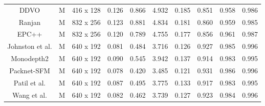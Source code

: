 \documentclass[journal]{IEEEtran}
\begin{document}
\begin{table*}
\begin{tabular}{cccccccccc}
DDVO \cite{wang2018learning}              & M                         & 416 x 128            & \multicolumn{1}{c}{0.126}   & \multicolumn{1}{c}{0.866}  & \multicolumn{1}{c}{4.932} & 0.185    & \multicolumn{1}{c}{0.851}           & \multicolumn{1}{c}{0.958}             & 0.986             \\
Ranjan \cite{ranjan2019competitive}            & M                         & 832 x 256            & \multicolumn{1}{c}{0.123}   & \multicolumn{1}{c}{0.881}  & \multicolumn{1}{c}{4.834} & 0.181    & \multicolumn{1}{c}{0.860}           & \multicolumn{1}{c}{0.959}             & 0.985             \\
EPC++ \cite{luo2019every}             & M                         & 832 x 256            & \multicolumn{1}{c}{0.120}   & \multicolumn{1}{c}{0.789}  & \multicolumn{1}{c}{4.755} & 0.177    & \multicolumn{1}{c}{0.856}           & \multicolumn{1}{c}{0.961}             & 0.987             \\
Johnston et al. \cite{johnston2020self}      & M                         & 640 x 192            & \multicolumn{1}{c}{0.081}   & \multicolumn{1}{c}{0.484}  & \multicolumn{1}{c}{3.716} & 0.126    & \multicolumn{1}{c}{0.927}           & \multicolumn{1}{c}{0.985}             & 0.996             \\
Monodepth2 \cite{monodepth2}        & M                         & 640 x 192            & \multicolumn{1}{c}{0.090}   & \multicolumn{1}{c}{0.545}  & \multicolumn{1}{c}{3.942} & 0.137    & \multicolumn{1}{c}{0.914}           & \multicolumn{1}{c}{0.983}             & 0.995             \\
Packnet-SFM \cite{guizilini20203d}       & M                         & 640 x 192            & \multicolumn{1}{c}{0.078}   & \multicolumn{1}{c}{0.420}  & \multicolumn{1}{c}{3.485} & 0.121    & \multicolumn{1}{c}{0.931}           & \multicolumn{1}{c}{0.986}             & 0.996             \\
Patil et al.\cite{patil2020don}       & M                         & 640 x 192            & \multicolumn{1}{c}{0.087}   & \multicolumn{1}{c}{0.495}  & \multicolumn{1}{c}{3.775} & 0.133    & \multicolumn{1}{c}{0.917}           & \multicolumn{1}{c}{0.983}             & 0.995             \\
Wang et al.\cite{wang2020self}        & M                         & 640 x 192            & \multicolumn{1}{c}{0.082}   & \multicolumn{1}{c}{0.462}  & \multicolumn{1}{c}{3.739} & 0.127    & \multicolumn{1}{c}{0.923}           & \multicolumn{1}{c}{0.984}             & 0.996             \\

\end{tabular}
\end{table*}
\end{document}
